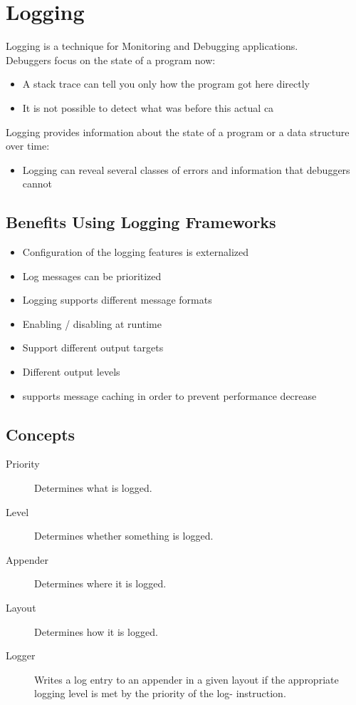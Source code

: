 \documentclass[a4paper,10pt]{article}
\begin{document}
\newpage
\section{Logging}
Logging is a technique for Monitoring and Debugging applications. \\
Debuggers focus on the state of a program now:
\begin{itemize}
	\item A stack trace can tell you only how the program got here directly
	\item It is not possible to detect what was before this actual ca
\end{itemize}
Logging provides information about the state of a program or a data structure over time:
\begin{itemize}
	\item Logging can reveal several classes of errors and information that debuggers cannot
\end{itemize}

\subsection{Benefits Using Logging Frameworks}
\begin{itemize}
	\item Configuration of the logging features is externalized
	\item Log messages can be prioritized
	\item Logging supports different message formats
	\item Enabling / disabling at runtime	
	\item Support different output targets
	\item Different output levels
	\item supports message caching in order to prevent performance decrease
\end{itemize}

\subsection{Concepts}
\begin{description}
	\item[Priority] Determines what is logged.
	\item[Level] Determines whether something is logged.
	\item[Appender] Determines where it is logged.
	\item[Layout] Determines how it is logged.
	\item[Logger] Writes a log entry to an appender in a given layout if the appropriate logging level is met by the priority of the log- instruction.
\end{description}
\end{document}
